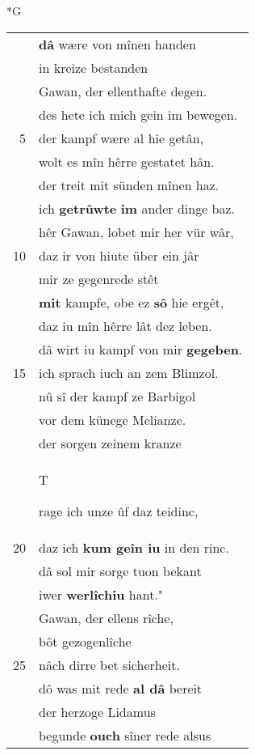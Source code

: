 \documentclass[8pt,a4paper,notitlepage]{article}
\begin{document}
\newpage
\begin{table}[ht]
\begin{minipage}[t]{0.5\linewidth}
\small
\begin{center}*G
\end{center}
\begin{tabular}{rl}
 & \textbf{dâ} wære von mînen handen\\ 
 & in kreize bestanden\\ 
 & Gawan, der ellenthafte degen.\\ 
 & des hete ich mich gein im bewegen.\\ 
5 & der kampf wære al hie getân,\\ 
 & wolt es mîn hêrre gestatet hân.\\ 
 & der treit mit sünden mînen haz.\\ 
 & ich \textbf{getrûwte} \textbf{im} ander dinge baz.\\ 
 & hêr Gawan, lobet mir her vür wâr,\\ 
10 & daz ir von hiute über ein jâr\\ 
 & mir ze gegenrede stêt\\ 
 & \textbf{mit} kampfe, obe ez \textbf{sô} hie ergêt,\\ 
 & daz iu mîn hêrre lât dez leben.\\ 
 & dâ wirt iu kampf von mir \textbf{gegeben}.\\ 
15 & ich sprach iuch an zem Blimzol.\\ 
 & nû sî der kampf ze Barbigol\\ 
 & vor dem künege Melianze.\\ 
 & der sorgen zeinem kranze\\ 
 & \begin{large}T\end{large}rage ich unze ûf daz teidinc,\\ 
20 & daz ich \textbf{kum gein iu} in den rinc.\\ 
 & dâ sol mir sorge tuon bekant\\ 
 & iwer \textbf{werlîchiu} hant."\\ 
 & Gawan, der ellens rîche,\\ 
 & bôt gezogenlîche\\ 
25 & nâch dirre bet sicherheit.\\ 
 & dô was mit rede \textbf{al dâ} bereit\\ 
 & der herzoge Lidamus\\ 
 & begunde \textbf{ouch} sîner rede alsus\\ 

\end{tabular}
\end{minipage}
\end{table}
\end{document}
